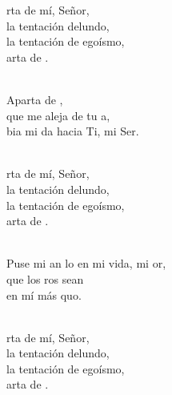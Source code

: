 \documentclass[12pt]{article}
\begin{document}
\begin{multicols*}{2}
\begin{cancion}%
	\begin{chorus}%
	rta de mí, Señor,\\
	la tentación delundo,\\
	la tentación de egoísmo, \\
	arta de .\\
	\end{chorus}%
	\jump\\
	Aparta de ,  \\
	que me aleja de tu a,\\
	bia mi da hacia Ti, mi Ser.\\\jump\\
	\begin{chorus}%
	rta de mí, Señor,\\
	la tentación delundo,\\
	la tentación de egoísmo, \\
	arta de .\\
	\end{chorus}%
	\jump\\
	Puse mi an lo en mi vida, mi or,  \\
	 que los ros sean \\
	en mí más quo.\\\jump\\
	\begin{chorus}%
	rta de mí, Señor,\\
	la tentación delundo,\\
	la tentación de egoísmo, \\
	arta de .\\
	\end{chorus}%
	\jump\\
\end{cancion}%


\end{multicols*}
\end{document}

